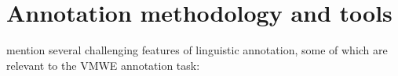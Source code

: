 \documentclass[output=paper,
modfonts,
]{langscibook}
\begin{document}
\section{Annotation methodology and tools}
\label{sec:methodology}

%
\citet{DBLP:journals/coling/MathetWM15} mention several challenging features of linguistic annotation, some of which are relevant to the VMWE annotation task:
\end{document}
